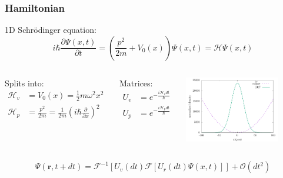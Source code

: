 \documentclass{beamer}
\begin{document}
\begin{frame}
\frametitle{Hamiltonian}
1D Schr\"odinger equation:
\begin{equation*}
i\hbar \frac{\partial \Psi(x, t)}{\partial t} = \left(\frac{ p^2}{2m} + V_0(x) \right)\Psi(x,t) = \mathcal{ H} \Psi(x,t)
\end{equation*}

\vspace{-0.25cm}
\begin{columns}
Splits into:
\begin{align*}
\mathcal{ H}_v &= V_0(x) = \frac{1}{2}m\omega^2x^2\\
\mathcal{ H}_p &= \frac{p^2}{2m} = \frac{1}{2m}\left(i\hbar \frac{\partial}{\partial x}\right)^2
\end{align*}

\vspace{-0.1cm}
Matrices:
\begin{align*}
{U}_v &= e^{-\frac{i\mathcal{{H}}_vdt}{\hbar}} \\
{U}_p &= e^{-\frac{i\mathcal{{H}}_pdt}{\hbar}}
\end{align*}

\begin{center}
\includegraphics[width=0.8\textwidth]{SHO_2.pdf}
\end{center}

\end{columns}

\vspace{0.25cm}

\begin{equation*}
\Psi(\mathbf{r}, t+dt) = \mathcal{F}^{-1}\left[{U}_v(dt) \mathcal{F} \left[{U}_r(dt) \Psi(x,t) \right] \right] + \mathcal{O}(dt^2)
\end{equation*}

\end{frame}
\end{document}
